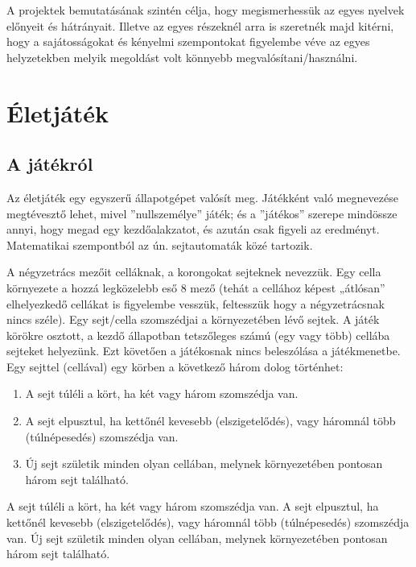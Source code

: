 A projektek bemutatásának szintén célja, hogy megismerhessük az egyes nyelvek előnyeit és hátrányait. Illetve az egyes részeknél arra is szeretnék majd kitérni, hogy a sajátosságokat és kényelmi szempontokat figyelembe véve az egyes helyzetekben melyik megoldást volt könnyebb megvalósítani/használni.



\section{Életjáték}
\label{sec:p_gameoflife}

\subsection{A játékról}
\label{subsec:p_aboutL}


Az életjáték egy egyszerű állapotgépet valósít meg. Játékként való megnevezése megtévesztő lehet, mivel ''nullszemélye'' játék; és a ''játékos'' szerepe mindössze annyi, hogy megad egy kezdőalakzatot, és azután csak figyeli az eredményt. Matematikai szempontból az ún. sejtautomaták közé tartozik. 

A négyzetrács mezőit celláknak, a korongokat sejteknek nevezzük. Egy cella környezete a hozzá legközelebb eső 8 mező (tehát a cellához képest „átlósan” elhelyezkedő cellákat is figyelembe vesszük, feltesszük hogy a négyzetrácsnak nincs széle). Egy sejt/cella szomszédjai a környezetében lévő sejtek. A játék körökre osztott, a kezdő állapotban tetszőleges számú (egy vagy több) cellába sejteket helyezünk. Ezt követően a játékosnak nincs beleszólása a játékmenetbe. Egy sejttel (cellával) egy körben a következő három dolog történhet:
\begin{enumerate}
	\item A sejt túléli a kört, ha két vagy három szomszédja van.
	\item A sejt elpusztul, ha kettőnél kevesebb (elszigetelődés), vagy háromnál több (túlnépesedés) szomszédja van.
	\item Új sejt születik minden olyan cellában, melynek környezetében pontosan három sejt található.
\end{enumerate}

\smallskip
A sejt túléli a kört, ha két vagy három szomszédja van.
A sejt elpusztul, ha kettőnél kevesebb (elszigetelődés), vagy háromnál több (túlnépesedés) szomszédja van.
Új sejt születik minden olyan cellában, melynek környezetében pontosan három sejt található.

